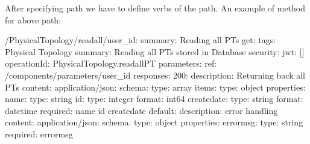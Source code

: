 \documentclass[letterpaper,10pt,english]{sphinxmanual}
\begin{document}
After specifying path we have to define verbs of the path.
An example of  method for above path:

\begin{sphinxVerbatim}[commandchars=\\\{\}]
/PhysicalTopology/read\PYGZus{}all/\PYGZob{}user_id\PYGZcb{}:
  summary: Reading all PT\PYGZsq{}s
  get:
    tags:
      \PYGZhy{} Physical Topology
    summary: Reading all PT\PYGZsq{}s stored in Database
    security:
      \PYGZhy{} jwt: []
    operationId: PhysicalTopology.read\PYGZus{}all\PYGZus{}PT
    parameters:
      \PYGZhy{} \PYGZdl{}ref: \PYGZsq{}\PYGZsh{}/components/parameters/user_id\PYGZsq{}
    responses:
      200:
        description: Returning back all PT\PYGZsq{}s
        content:
          application/json:
            schema:
              type: array
              items:
                type: object
                properties:
                  name:
                    type: string
                  id:
                    type: integer
                    format: int64
                  create\PYGZus{}date:
                    type: string
                    format: date\PYGZhy{}time
                required:
                  \PYGZhy{} name
                  \PYGZhy{} id
                  \PYGZhy{} create\PYGZus{}date
      default:
        description: error handling
        content:
          application/json:
            schema:
              type: object
              properties:
                error\PYGZus{}msg:
                  type: string
              required:
                \PYGZhy{} error\PYGZus{}msg
\end{sphinxVerbatim}
\end{document}

